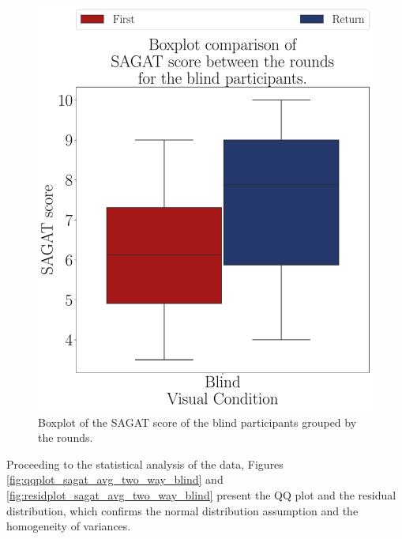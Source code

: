 \begin{figure}[!htb]
    \begin{minipage}{0.075\textwidth}
        \hfill
    \end{minipage}
    \begin{minipage}{0.45\textwidth}
        \centering
        \includegraphics[width = \textwidth]{Resultados/Sagat/Figuras/pdf/boxplot_sagat_blind_rounds.pdf}
        \caption{Boxplot of the SAGAT score of the blind participants grouped by the rounds.}
        \label{fig:boxplot_sagat_blind_rounds}
    \end{minipage}
\end{figure}

Proceeding to the statistical analysis of the data, Figures \ref{fig:qqplot_sagat_avg_two_way_blind} and \ref{fig:residplot_sagat_avg_two_way_blind} present the QQ plot and the residual distribution, which confirms the normal distribution assumption and the homogeneity of variances.

